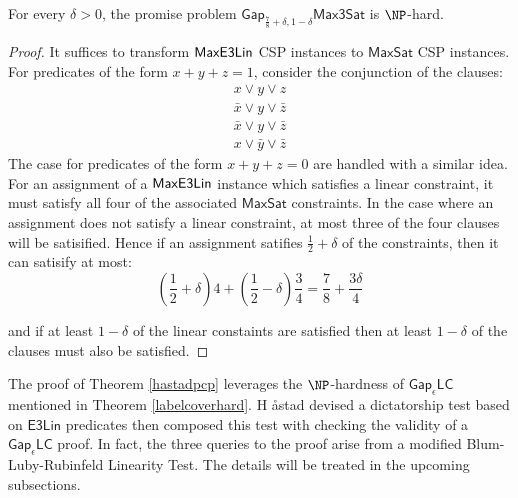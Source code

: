 \begin{corollary}
For every $\delta >0$, the promise problem $\mathsf{Gap}_{\frac{7}{8}+\delta,1-\delta}\mathsf{Max3Sat}$ is $\NP$-hard.
\end{corollary}
%
\begin{proof}
It suffices to transform $\mathsf{MaxE3Lin}$ CSP instances to $\mathsf{MaxSat}$ CSP instances. For predicates of the form $x + y + z = 1$, consider the conjunction of the clauses:
\begin{align*}
   x \vee y \vee z \\
   \bar{x} \vee y \vee \bar{z} \\
   \bar{x} \vee y \vee \bar{z} \\
   x \vee \bar{y} \vee \bar{z}
\end{align*}
The case for predicates of the form $x + y + z = 0$ are handled with a similar idea. For an assignment of a $\mathsf{MaxE3Lin}$ instance which satisfies a linear constraint, it must satisfy all four of the associated $\mathsf{MaxSat}$ constraints. In the case where an assignment does not satisfy a linear constraint, at most three of the four clauses will be satisified. Hence if an assignment satifies $\frac{1}{2} + \delta$ of the constraints, then it can satisify at most:
\[ (\frac{1}{2} + \delta)4 + (\frac{1}{2} - \delta)\frac{3}{4} = \frac{7}{8} + \frac{3\delta}{4}\]

and if at least $1 - \delta$ of the linear constaints are satisfied then at least $1 - \delta$ of the clauses must also be satisfied.
\end{proof}

The proof of Theorem \ref{hastadpcp} leverages the $\NP$-hardness of $\mathsf{Gap}_\epsilon\mathsf{LC}$ mentioned in Theorem \ref{labelcoverhard}. H \aa stad devised a dictatorship test based on $\mathsf{E3Lin}$ predicates then composed this test with checking the validity of a $\mathsf{Gap}_\epsilon\mathsf{LC}$ proof. In fact, the three queries to the proof arise from a modified Blum-Luby-Rubinfeld Linearity Test. The details will be treated in the upcoming subsections.

